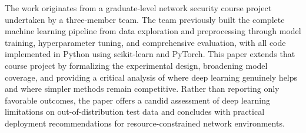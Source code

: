 \begin{background}
The work originates from a graduate-level network security course project undertaken by a three-member team. The team previously built the complete machine learning pipeline from data exploration and preprocessing through model training, hyperparameter tuning, and comprehensive evaluation, with all code implemented in Python using scikit-learn and PyTorch. This paper extends that course project by formalizing the experimental design, broadening model coverage, and providing a critical analysis of where deep learning genuinely helps and where simpler methods remain competitive. Rather than reporting only favorable outcomes, the paper offers a candid assessment of deep learning limitations on out-of-distribution test data and concludes with practical deployment recommendations for resource-constrained network environments.
\end{background}
